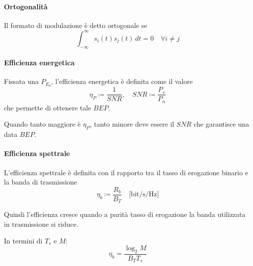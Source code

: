 \paragraph*{Ortogonalità}

Il formato di modulazione è detto ortogonale se
\begin{equation*}
    \int_{-\infty}^{\infty} s_{i}(t) s_{j}(t) \, dt = 0 \quad \forall i \neq j
\end{equation*}

\paragraph*{Efficienza energetica}

Fissata una \( P_{E_{b}} \), l'efficienza energetica è definita come il valore
\begin{equation*}
    \eta_{P} \coloneqq \frac{1}{SNR} , \quad SNR \coloneqq \frac{P_{s}}{P_{n}}
\end{equation*}
che permette di ottenere tale \( BEP \).

Quando tanto maggiore è \( \eta_{P} \), tanto minore deve essere il \( SNR \) che garantisce una data \( BEP \).

\paragraph*{Efficienza spettrale}

L'efficienza spettrale è definita con il rapporto tra il tasso di erogazione binario e la banda di trasmissione
\begin{equation*}
    \eta_{b} \coloneqq \frac{R_{b}}{B_{T}} \quad \text{[bit/s/Hz]}
\end{equation*}

Quindi l'efficienza cresce quando a parità tasso di erogazione la banda utilizzata in trasmissione si riduce.

In termini di \( T_{s} \) e \( M \):
\begin{equation*}
    \eta_{b} = \frac{\log_2 M}{B_{T} T_{s}}
\end{equation*}

